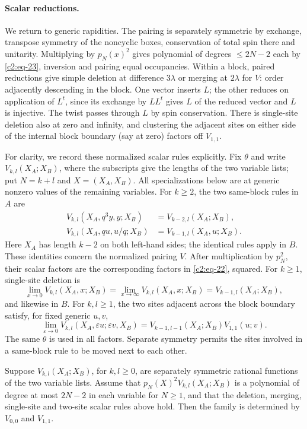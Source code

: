 \paragraph{Scalar reductions.}
We return to generic rapidities. The pairing is separately symmetric by exchange, transpose symmetry of the noncyclic boxes, conservation of total spin there and unitarity. Multiplying by \(p_N(x)^2\) gives polynomial of degrees \(\le2N-2\) each by \eqref{c2:eq-23}, inversion and pairing equal occupancies. Within a block, paired reductions give simple deletion at difference \(3\lambda\) or merging at \(2\lambda\) for \(V\): order adjacently descending in the block. One vector inserts \(L\); the other reduces on application of \(L^t\), since its exchange by \(LL^t\) gives \(L\) of the reduced vector and \(L\) is injective. The twist passes through \(L\) by spin conservation. There is single-site deletion also at zero and infinity, and clustering the adjacent sites on either side of the internal block boundary (say at zero) factors off \(V_{1,1}\).

For clarity, we record these normalized scalar rules explicitly.  Fix
$\theta$ and write $V_{k,l}(X_A;X_B)$, where the subscripts give the lengths
of the two variable lists; put $N=k+l$ and $X=(X_A,X_B)$.  All specializations
below are at generic nonzero values of the remaining variables.  For $k\ge2$,
the two same-block rules in $A$ are
\[
\begin{aligned}
 V_{k,l}(X_A,q^3y,y;X_B)&=V_{k-2,l}(X_A;X_B),\\
 V_{k,l}(X_A,qu,u/q;X_B)&=V_{k-1,l}(X_A,u;X_B).
\end{aligned}
\]
Here $X_A$ has length $k-2$ on both left-hand sides; the identical rules
apply in $B$.  These identities concern the normalized pairing $V$.
After multiplication by $p_N^2$, their scalar factors are the corresponding
factors in \eqref{c2:eq-22}, squared.  For $k\ge1$, single-site deletion is
\[
 \lim_{x\to0}V_{k,l}(X_A,x;X_B)
 =\lim_{x\to\infty}V_{k,l}(X_A,x;X_B)
 =V_{k-1,l}(X_A;X_B),
\]
and likewise in $B$.  For $k,l\ge1$, the two sites adjacent across the
block boundary satisfy, for fixed generic $u,v$,
\[
 \lim_{\varepsilon\to0}
 V_{k,l}(X_A,\varepsilon u;\varepsilon v,X_B)
 =V_{k-1,l-1}(X_A;X_B)V_{1,1}(u;v).
\]
The same $\theta$ is used in all factors.  Separate symmetry permits the
sites involved in a same-block rule to be moved next to each other.

\begin{lemma}
\label{c2:lem-scalar-uniqueness}
Suppose $V_{k,l}(X_A;X_B)$, for $k,l\ge0$, are separately symmetric
rational functions of the two variable lists.  Assume that
$p_N(X)^2V_{k,l}(X_A;X_B)$ is a polynomial of degree at most $2N-2$ in
each variable for $N\ge1$, and that the deletion, merging, single-site and
two-site scalar rules above hold.  Then the family is determined by
$V_{0,0}$ and $V_{1,1}$.
\end{lemma}


